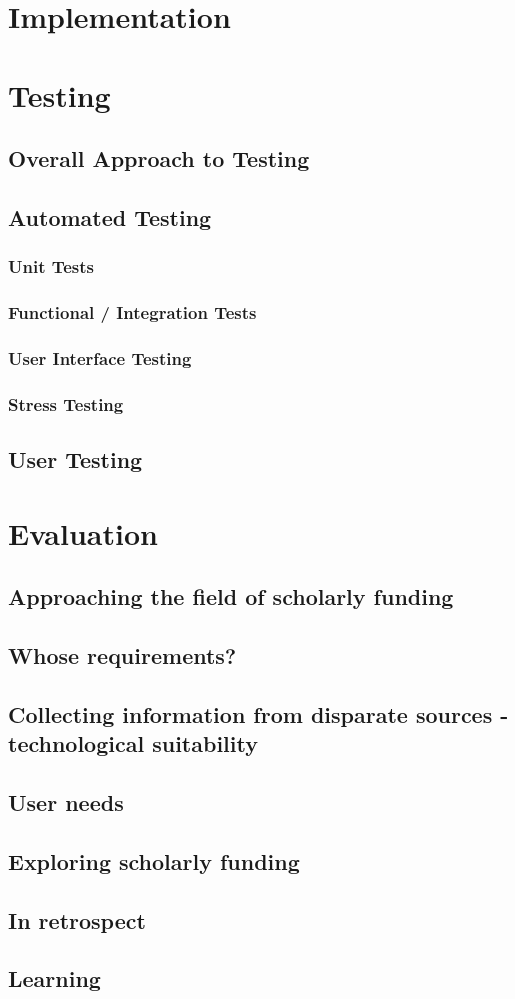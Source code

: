 \chapter{Implementation}



\chapter{Testing}
\section{Overall Approach to Testing}
\section{Automated Testing}
\subsection{Unit Tests}
\subsection{Functional / Integration Tests}
\subsection{User Interface Testing}
\subsection{Stress Testing}
\section{User Testing}



\chapter{Evaluation}
\section{Approaching the field of scholarly funding}
\section{Whose requirements?}
\section{Collecting information from disparate sources - technological suitability}
\section{User needs}
\section{Exploring scholarly funding}
\section{In retrospect}
\section{Learning}
